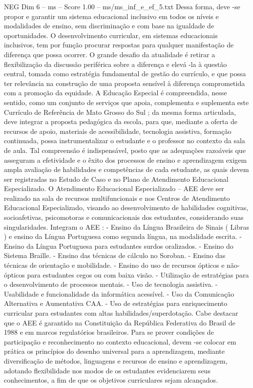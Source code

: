\begin{textsample}{NEG Dim 6 – ms – Score 1.00 – ms/ms\_inf\_e\_ef\_5.txt}
Dessa forma, deve -se propor e garantir um sistema educacional inclusivo em todos os níveis e modalidades de ensino, sem discriminação e com base na igualdade de oportunidades.
O desenvolvimento curricular, em sistemas educacionais inclusivos, tem por função procurar respostas para qualquer manifestação de diferença que possa ocorrer.
O grande desafio da atualidade é retirar a flexibilização da discussão periférica sobre a diferença e elevá -la à questão central, tomada como estratégia fundamental de gestão do currículo, e que possa ter relevância na construção de uma proposta sensível à diferença comprometida com a promoção da equidade.
A Educação Especial é compreendida, nesse sentido, como um conjunto de serviços que apoia, complementa e suplementa este Currículo de Referência de Mato Grosso do Sul ; da mesma forma articulada, deve integrar a proposta pedagógica da escola, para que, mediante a oferta de recursos de apoio, materiais de acessibilidade, tecnologia assistiva, formação continuada, possa instrumentalizar o estudante e o professor no contexto da sala de aula.
Tal compreensão é indispensável, posto que as adequações razoáveis que asseguram a efetividade e o êxito dos processos de ensino e aprendizagem exigem ampla avaliação de habilidades e competências de cada estudante, as quais devem ser registradas no Estudo de Caso e no Plano de Atendimento Educacional Especializado.
O Atendimento Educacional Especializado – AEE deve ser realizado na sala de recursos multifuncionais e nos Centros de Atendimento Educacional Especializado, visando ao desenvolvimento de habilidades cognitivas, socioafetivas, psicomotoras e comunicacionais dos estudantes, considerando suas singularidades.
Integram o AEE : - Ensino da Língua Brasileira de Sinais ( Libras ) e ensino da Língua Portuguesa como segunda língua, na modalidade escrita. - Ensino da Língua Portuguesa para estudantes surdos oralizados. - Ensino do Sistema Braille. - Ensino das técnicas de cálculo no Soroban. - Ensino das técnicas de orientação e mobilidade. - Ensino do uso de recursos ópticos e não-ópticos para estudantes cegos ou com baixa visão. - Utilização de estratégias para o desenvolvimento de processos mentais. - Uso de tecnologia assistiva. - Usabilidade e funcionalidade da informática acessível. - Uso da Comunicação Alternativa e Aumentativa CAA. - Uso de estratégias para enriquecimento curricular para estudantes com altas habilidades/superdotação.
Cabe destacar que o AEE é garantido na Constituição da República Federativa do Brasil de 1988 e em marcos regulatórios brasileiros.
Para se prover condições de participação e reconhecimento no contexto educacional, devem -se colocar em prática os princípios do desenho universal para a aprendizagem, mediante diversificação de métodos, linguagens e recursos de ensino e aprendizagem, adotando flexibilidade nos modos de os estudantes evidenciarem seus conhecimentos, a fim de que os objetivos curriculares sejam alcançados.

\end{textsample}
